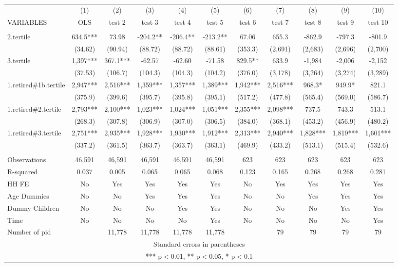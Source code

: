\begin{tabular}{lcccccccccc} \hline
 & (1) & (2) & (3) & (4) & (5) & (6) & (7) & (8) & (9) & (10) \\
VARIABLES & OLS & test 2 & test 3 & test 4 & test 5 & test 6 & test 7 & test 8 & test 9 & test 10 \\ \hline
 &  &  &  &  &  &  &  &  &  &  \\
2.tertile & 634.5*** & 73.98 & -204.2** & -206.4** & -213.2** & 67.06 & 655.3 & -862.9 & -797.3 & -801.9 \\
 & (34.62) & (90.94) & (88.72) & (88.72) & (88.61) & (353.3) & (2,691) & (2,683) & (2,696) & (2,700) \\
3.tertile & 1,397*** & 367.1*** & -62.57 & -62.60 & -71.58 & 829.5** & 633.9 & -1,984 & -2,006 & -2,152 \\
 & (37.53) & (106.7) & (104.3) & (104.3) & (104.2) & (376.0) & (3,178) & (3,264) & (3,274) & (3,289) \\
1.retired\#1b.tertile & 2,947*** & 2,516*** & 1,359*** & 1,357*** & 1,389*** & 1,942*** & 2,516*** & 968.3* & 949.9* & 821.1 \\
 & (375.9) & (399.6) & (395.7) & (395.8) & (395.1) & (517.2) & (477.8) & (565.4) & (569.0) & (586.7) \\
1.retired\#2.tertile & 2,793*** & 2,100*** & 1,023*** & 1,024*** & 1,051*** & 2,355*** & 2,098*** & 737.5 & 743.3 & 513.1 \\
 & (268.3) & (307.8) & (306.9) & (307.0) & (306.5) & (384.0) & (368.1) & (453.2) & (456.9) & (480.2) \\
1.retired\#3.tertile & 2,751*** & 2,935*** & 1,928*** & 1,930*** & 1,912*** & 2,313*** & 2,940*** & 1,828*** & 1,819*** & 1,601*** \\
 & (337.2) & (361.5) & (363.7) & (363.7) & (363.1) & (469.9) & (433.2) & (513.1) & (515.4) & (532.6) \\
 &  &  &  &  &  &  &  &  &  &  \\
Observations & 46,591 & 46,591 & 46,591 & 46,591 & 46,591 & 623 & 623 & 623 & 623 & 623 \\
R-squared & 0.037 & 0.005 & 0.065 & 0.065 & 0.068 & 0.123 & 0.165 & 0.268 & 0.268 & 0.281 \\
HH FE & No & Yes & Yes & Yes & Yes & No & Yes & Yes & Yes & Yes \\
Age Dummies & No & No & Yes & Yes & Yes & No & No & Yes & Yes & Yes \\
Dummy Children & No & No & No & Yes & Yes & No & No & No & Yes & Yes \\
Time & No & No & No & No & Yes & No & No & No & No & Yes \\
 Number of pid &  & 11,778 & 11,778 & 11,778 & 11,778 &  & 79 & 79 & 79 & 79 \\ \hline
\multicolumn{11}{c}{ Standard errors in parentheses} \\
\multicolumn{11}{c}{ *** p$<$0.01, ** p$<$0.05, * p$<$0.1} \\
\end{tabular}
